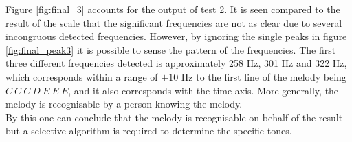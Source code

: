 Figure \ref{fig:final_3} accounts for the output of test 2. It is seen compared to the result of the scale that the significant frequencies are not as clear due to several incongruous detected frequencies. However, by ignoring the single peaks in figure \ref{fig:final_peak3} it is possible to sense the pattern of the frequencies. The first three different frequencies detected is approximately 258 Hz, 301 Hz and 322 Hz, which corresponds within a range of $\pm 10$ Hz to the first line of the melody being $C \ C \ C \ D \ E \ E \ E$, and it also corresponds with the time axis. More generally, the melody is recognisable by a person knowing the melody. \\
By this one can conclude that the melody is recognisable on behalf of the result but a selective algorithm is required to determine the specific tones.                  

